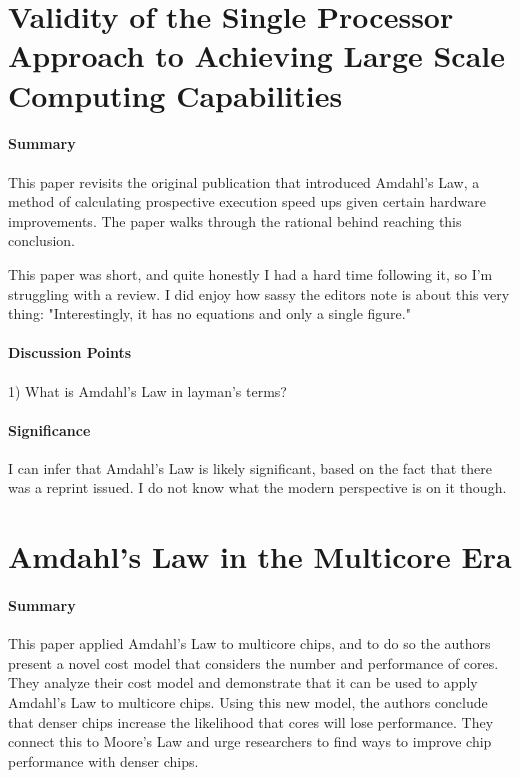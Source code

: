 \section {Validity of the Single Processor Approach to Achieving Large Scale
Computing Capabilities \cite{amdahl1967validity}}


\paragraph{\textbf{Summary}}
This paper revisits the original publication that introduced Amdahl's Law,
a method of calculating prospective execution speed ups given certain
hardware improvements. The paper walks through the rational behind reaching
this conclusion.

This paper was short, and quite honestly I had a hard time following it, so
I'm struggling with a review. I did enjoy how sassy the editors note is
about this very thing: "Interestingly, it has no equations and only a single
figure."
\paragraph{\textbf{Discussion Points}}
1) What is Amdahl's Law in layman's terms?
\paragraph{\textbf{Significance}}
I can infer that Amdahl's Law is likely significant, based on the fact that
there was a reprint issued. I do not know what the modern perspective is on
it though.


\section {Amdahl’s Law in the Multicore Era \cite{hill2008amdahl}}

\paragraph{\textbf{Summary}}
This paper applied Amdahl's Law to multicore chips, and to do so the authors
present a novel cost model that considers the number and performance of
cores. They analyze their cost model and demonstrate that it can be used to
apply Amdahl's Law to multicore chips. Using this new model, the authors
conclude that denser chips increase the likelihood that cores will lose
performance. They connect this to Moore's Law and urge researchers to find
ways to improve chip performance with denser chips.

